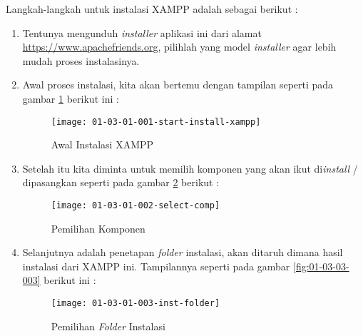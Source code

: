 Langkah-langkah untuk instalasi XAMPP adalah sebagai berikut :

\begin{enumerate}

	\item Tentunya mengunduh \textit{installer} aplikasi ini dari alamat \url{https://www.apachefriends.org}, pilihlah yang model \textit{installer} agar lebih mudah proses instalasinya.
	
	\item Awal proses instalasi, kita akan bertemu dengan tampilan seperti pada gambar \ref{fig:01-03-01-001} berikut ini :
	
	\begin{figure}[H]
		\centering
		\texttt{[image: 01-03-01-001-start-install-xampp]}
		\caption{Awal Instalasi XAMPP}
		\label{fig:01-03-01-001}
	\end{figure}
	
	\item Setelah itu kita diminta untuk memilih komponen yang akan ikut di\textit{install} / dipasangkan seperti pada gambar \ref{fig:01-03-01-002} berikut :
	
	\begin{figure}[H]
		\centering
		\texttt{[image: 01-03-01-002-select-comp]}
		\caption{Pemilihan Komponen}
		\label{fig:01-03-01-002}
	\end{figure}
	
	\item Selanjutnya adalah penetapan \textit{folder} instalasi, akan ditaruh dimana hasil instalasi dari XAMPP ini. Tampilannya seperti pada gambar \ref{fig:01-03-03-003} berikut ini :
	
	\begin{figure}[H]
		\centering
		\texttt{[image: 01-03-01-003-inst-folder]}
		\caption{Pemilihan \textit{Folder} Instalasi}
		\label{fig:01-03-01-003}
	\end{figure}
	
\end{enumerate}
